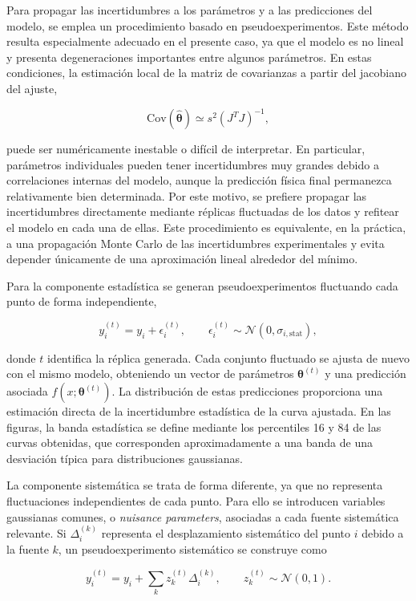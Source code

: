 \documentclass[12pt,a4paper]{article}
\begin{document}
Para propagar las incertidumbres a los parámetros y a las predicciones del modelo, se emplea un procedimiento basado en pseudoexperimentos. Este método resulta especialmente adecuado en el presente caso, ya que el modelo es no lineal y presenta degeneraciones importantes entre algunos parámetros. En estas condiciones, la estimación local de la matriz de covarianzas a partir del jacobiano del ajuste,

\[
\mathrm{Cov}(\hat{\boldsymbol{\theta}})
\simeq
s^2(J^TJ)^{-1},
\]

puede ser numéricamente inestable o difícil de interpretar. En particular, parámetros individuales pueden tener incertidumbres muy grandes debido a correlaciones internas del modelo, aunque la predicción física final permanezca relativamente bien determinada. Por este motivo, se prefiere propagar las incertidumbres directamente mediante réplicas fluctuadas de los datos y refitear el modelo en cada una de ellas. Este procedimiento es equivalente, en la práctica, a una propagación Monte Carlo de las incertidumbres experimentales y evita depender únicamente de una aproximación lineal alrededor del mínimo.

Para la componente estadística se generan pseudoexperimentos fluctuando cada punto de forma independiente,

\[
y_i^{(t)}
= 
y_i
+
\epsilon_i^{(t)},
\qquad
\epsilon_i^{(t)}
\sim
\mathcal{N}(0,\sigma_{i,\mathrm{stat}}),
\]

donde $t$ identifica la réplica generada. Cada conjunto fluctuado se ajusta de nuevo con el mismo modelo, obteniendo un vector de parámetros $\boldsymbol{\theta}^{(t)}$ y una predicción asociada $f(x;\boldsymbol{\theta}^{(t)})$. La distribución de estas predicciones proporciona una estimación directa de la incertidumbre estadística de la curva ajustada. En las figuras, la banda estadística se define mediante los percentiles 16 y 84 de las curvas obtenidas, que corresponden aproximadamente a una banda de una desviación típica para distribuciones gaussianas.

La componente sistemática se trata de forma diferente, ya que no representa fluctuaciones independientes de cada punto. Para ello se introducen variables gaussianas comunes, o \textit{nuisance parameters}, asociadas a cada fuente sistemática relevante. Si $\Delta_i^{(k)}$ representa el desplazamiento sistemático del punto $i$ debido a la fuente $k$, un pseudoexperimento sistemático se construye como

\[
y_i^{(t)}
=
y_i
+
\sum_k z_k^{(t)}\Delta_i^{(k)},
\qquad
z_k^{(t)}
\sim
\mathcal{N}(0,1).
\]
\end{document}
